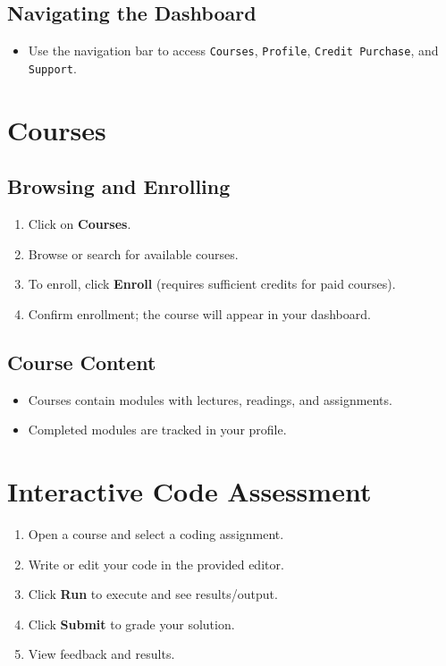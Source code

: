 \documentclass[a4paper,11pt]{scrartcl}
\begin{document}
\subsection{Navigating the Dashboard}
\begin{itemize}[leftmargin=*]
    \item Use the navigation bar to access \texttt{Courses}, \texttt{Profile}, \texttt{Credit Purchase}, and \texttt{Support}.
\end{itemize}

\section{Courses}

\subsection{Browsing and Enrolling}
\begin{enumerate}[leftmargin=*]
    \item Click on \textbf{Courses}.
    \item Browse or search for available courses.
    \item To enroll, click \textbf{Enroll} (requires sufficient credits for paid courses).
    \item Confirm enrollment; the course will appear in your dashboard.
\end{enumerate}

\subsection{Course Content}
\begin{itemize}[leftmargin=*]
    \item Courses contain modules with lectures, readings, and assignments.
    \item Completed modules are tracked in your profile.
\end{itemize}

\section{Interactive Code Assessment}

\begin{enumerate}[leftmargin=*]
    \item Open a course and select a coding assignment.
    \item Write or edit your code in the provided editor.
    \item Click \textbf{Run} to execute and see results/output.
    \item Click \textbf{Submit} to grade your solution.
    \item View feedback and results.
\end{enumerate}
\end{document}
